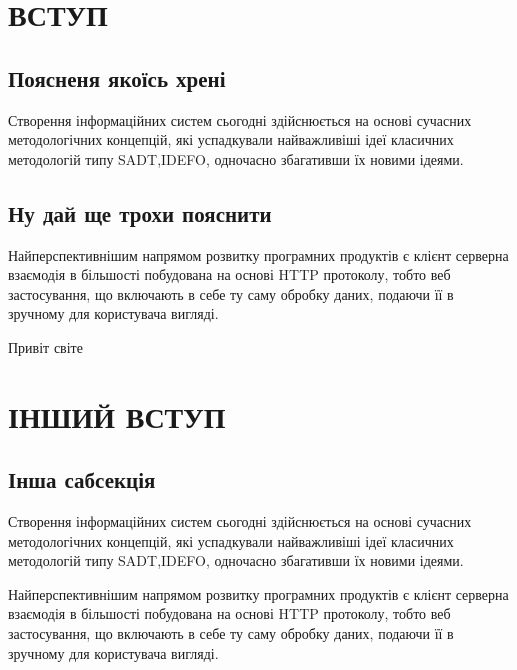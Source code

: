 \documentclass{lib/styles/default-style}
\begin{document}
\pagestyle{default-numbered}
\section{ВСТУП}
\subsection{Поясненя якоїсь хрені}
 Створення  інформаційних  систем  сьогодні  здійснюється  
на  основі сучасних  методологічних  концепцій,
які  успадкували  найважливіші  ідеї класичних методологій типу
SADT,IDEFO, одночасно збагативши їх новими ідеями.
\subsection{Ну дай ще трохи пояснити}
 Найперспективнішим напрямом розвитку програмних
продуктів є клієнт серверна взаємодія в більшості
побудована на основі HTTP протоколу, тобто веб застосування,
що включають в себе ту саму обробку даних, подаючи її
в зручному для користувача вигляді.

 Привіт світе


\section{ІНШИЙ ВСТУП}
\subsection{Інша сабсекція}
Створення  інформаційних  систем  сьогодні  здійснюється  
на  основі сучасних  методологічних  концепцій,
які  успадкували  найважливіші  ідеї класичних методологій типу
SADT,IDEFO, одночасно збагативши їх новими ідеями.

 Найперспективнішим напрямом розвитку програмних
продуктів є клієнт серверна взаємодія в більшості
побудована на основі HTTP протоколу, тобто веб застосування,
що включають в себе ту саму обробку даних, подаючи її
в зручному для користувача вигляді.
\end{document}
